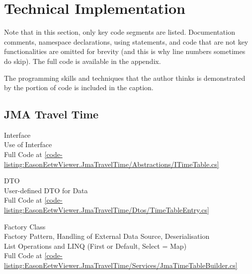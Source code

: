 \chapter{Technical Implementation}

Note that in this section, only key code segments are listed. Documentation comments, namespace declarations, using statements, and code that are not key functionalities are omitted for brevity (and this is why line numbers sometimes do skip). The full code is available in the appendix.

The programming skills and techniques that the author thinks is demonstrated by the portion of code is included in the caption.

\section{JMA Travel Time}
\begin{normallisting}
    \caption[ Interface]{
         Interface \\
        Use of Interface \\
        Full Code at \autoref{code-listing:EasonEetwViewer.JmaTravelTime/Abstractions/ITimeTable.cs}}
\end{normallisting}

\begin{normallisting}
    \caption[ DTO]{
         DTO \\
        User-defined DTO for Data \\
        Full Code at \autoref{code-listing:EasonEetwViewer.JmaTravelTime/Dtos/TimeTableEntry.cs}}
\end{normallisting}

\begin{normallisting}
    \caption[ Factory Class]{
         Factory Class \\
        Factory Pattern, Handling of External Data Source, Deserialisation \\
        List Operations and LINQ (First or Default, Select = Map) \\
        Full Code at \autoref{code-listing:EasonEetwViewer.JmaTravelTime/Services/JmaTimeTableBuilder.cs}}
\end{normallisting}

